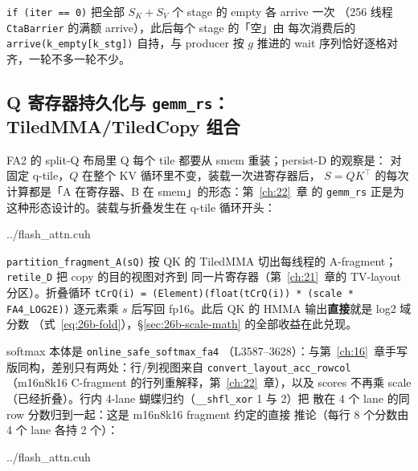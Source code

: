 \texttt{if (iter == 0)} 把全部 $S_K{+}S_V$ 个 stage 的 empty 各 arrive 一次
（256 线程 \texttt{CtaBarrier} 的满额 arrive），此后每个 stage 的「空」由
每次消费后的 \texttt{arrive(k\_empty[k\_stg])} 自持，与 producer 按 $g$
推进的 wait 序列恰好逐格对齐，一轮不多一轮不少。
\subsection{Q 寄存器持久化与 \texttt{gemm\_rs}：TiledMMA/TiledCopy 组合}\label{sec:26b-persistq}

FA2 的 split-Q 布局里 Q 每个 tile 都要从 smem 重装；persist-D 的观察是：
对固定 q-tile，$Q$ 在整个 KV 循环里不变，装载一次进寄存器后，
$S = QK^\top$ 的每次计算都是「A 在寄存器、B 在 smem」的形态：第~\ref{ch:22}~章
的 \texttt{gemm\_rs} 正是为这种形态设计的。装载与折叠发生在 q-tile 循环开头：

\begin{lstinputlisting}[linerange={3883-3892},firstnumber=auto,
  title={flash\_attn.cuh L3883-3892（Q s2r 一次 + scale$\cdot\log_2 e$ 折叠进 A-fragment）}]{../flash_attn.cuh}
\end{lstinputlisting}

\texttt{partition\_\allowbreak{}fragment\_\allowbreak{}A(sQ)} 按 QK 的
TiledMMA 切出每线程的 A-fragment；\texttt{retile\_D} 把 copy 的目的视图对齐到
同一片寄存器（第~\ref{ch:21}~章的 TV-layout 分区）。折叠循环
\texttt{tCrQ(i) = (Element)(float(tCrQ(i)) * (scale * FA4\_LOG2E))} 逐元素乘
$s$ 后写回 fp16。此后 QK 的 HMMA 输出\textbf{直接}就是 log2 域分数
（式~\eqref{eq:26b-fold}），\S\ref{sec:26b-scale-math} 的全部收益在此兑现。

softmax 本体是 \texttt{online\_\allowbreak{}safe\_\allowbreak{}softmax\_\allowbreak{}fa4}
（L3587--3628）：与第~\ref{ch:16}~章手写版同构，差别只有两处：行/列视图来自
\texttt{convert\_\allowbreak{}layout\_\allowbreak{}acc\_\allowbreak{}rowcol}
（m16n8k16 C-fragment 的行列重解释，第~\ref{ch:22}~章），以及 scores 不再乘
scale（已经折叠）。行内 4-lane 蝴蝶归约（\texttt{\_\_shfl\_xor} 1 与 2）把
散在 4 个 lane 的同 row 分数归到一起：这是 m16n8k16 fragment 约定的直接
推论（每行 8 个分数由 4 个 lane 各持 2 个）：

\begin{lstinputlisting}[linerange={3587-3628},firstnumber=auto,
  title={flash\_attn.cuh L3587-3628（\texttt{online\_safe\_softmax\_fa4}：log2 域 + 条件重缩放全函数）}]{../flash_attn.cuh}
\end{lstinputlisting}

